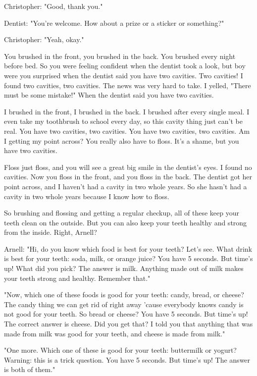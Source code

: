Christopher: "Good, thank you."

Dentist: "You're welcome. How about a prize or a sticker or something?"

Christopher: "Yeah, okay."

You brushed in the front, you brushed in the back. You brushed every night before bed. So you were feeling confident when the dentist took a look, but boy were you surprised when the dentist said you have two cavities. Two cavities! I found two cavities, two cavities. The news was very hard to take. I yelled, "There must be some mistake!" When the dentist said you have two cavities.

I brushed in the front, I brushed in the back. I brushed after every single meal. I even take my toothbrush to school every day, so this cavity thing just can't be real. You have two cavities, two cavities. You have two cavities, two cavities. Am I getting my point across? You really also have to floss. It's a shame, but you have two cavities.

Floss just floss, and you will see a great big smile in the dentist's eyes. I found no cavities. Now you floss in the front, and you floss in the back. The dentist got her point across, and I haven't had a cavity in two whole years. So she hasn't had a cavity in two whole years because I know how to floss.

So brushing and flossing and getting a regular checkup, all of these keep your teeth clean on the outside. But you can also keep your teeth healthy and strong from the inside. Right, Arnell?

Arnell: "Hi, do you know which food is best for your teeth? Let's see. What drink is best for your teeth: soda, milk, or orange juice? You have 5 seconds. But time's up! What did you pick? The answer is milk. Anything made out of milk makes your teeth strong and healthy. Remember that."

"Now, which one of these foods is good for your teeth: candy, bread, or cheese? The candy thing we can get rid of right away 'cause everybody knows candy is not good for your teeth. So bread or cheese? You have 5 seconds. But time's up! The correct answer is cheese. Did you get that? I told you that anything that was made from milk was good for your teeth, and cheese is made from milk."

"One more. Which one of these is good for your teeth: buttermilk or yogurt? Warning: this is a trick question. You have 5 seconds. But time's up! The answer is both of them."

